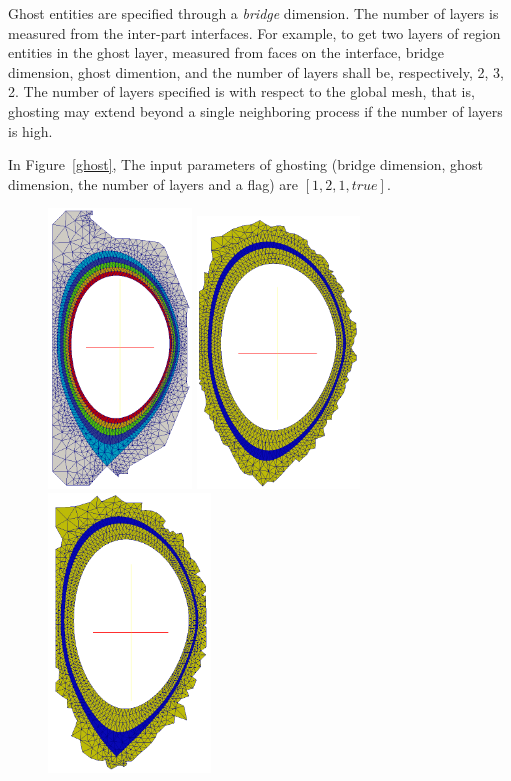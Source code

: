 Ghost entities are specified through a \emph{bridge} dimension.  The number of layers is measured from the inter-part interfaces.  For example, to get two layers of region entities in the ghost layer, measured from faces on the interface, bridge dimension, ghost dimention, and the number of layers shall be, respectively, 2, 3, 2. The number of layers specified is with respect to the global mesh, that is, ghosting may extend beyond a single neighboring process if the number of layers is high.

In Figure~\ref{ghost}, The input parameters of ghosting (bridge dimension, ghost dimension, the number of layers and a flag) are $[1, 2, 1, true]$.

\begin{figure}
\centering
\includegraphics[width=1.5in]{./fig/part17-22.png}\hspace{1cm}
\includegraphics[width=1.7in]{./fig/part20-ghosted-copy}\hspace{1cm}
\includegraphics[width=1.7in]{./fig/part21-ghosted-copy}\hspace{1cm}

\end{figure}
